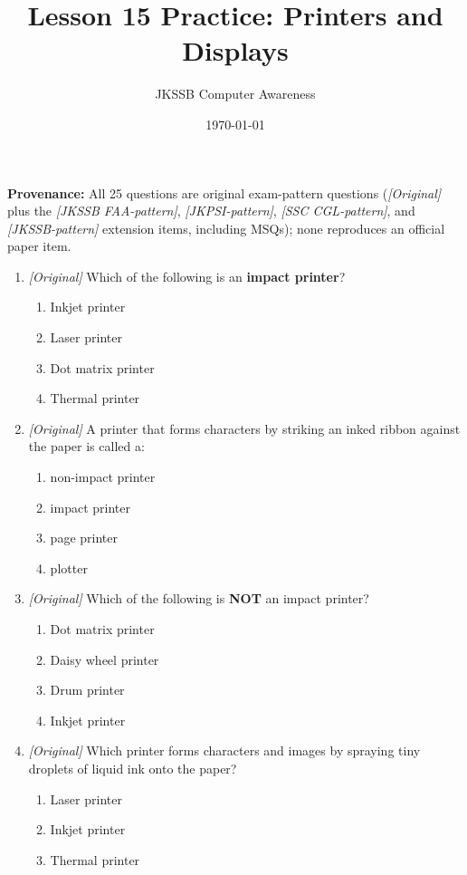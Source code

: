 \documentclass[11pt]{article}
\title{Lesson 15 Practice: Printers and Displays}
\author{JKSSB Computer Awareness}
\date{\today}
\begin{document}
\maketitle
\noindent\textbf{Provenance:} All 25 questions are original exam-pattern questions (\textit{[Original]} plus the \textit{[JKSSB FAA-pattern]}, \textit{[JKPSI-pattern]}, \textit{[SSC CGL-pattern]}, and \textit{[JKSSB-pattern]} extension items, including MSQs); none reproduces an official paper item.

\begin{enumerate}[label=\textbf{Q\arabic*.}, leftmargin=*]
\item \textit{[Original]} Which of the following is an \textbf{impact
  printer}?
  \begin{enumerate}[label=\Alph*.]
    \item Inkjet printer
    \item Laser printer
    \item Dot matrix printer
    \item Thermal printer
  \end{enumerate}
\item \textit{[Original]} A printer that forms characters by striking an
  inked ribbon against the paper is called a:
  \begin{enumerate}[label=\Alph*.]
    \item non-impact printer
    \item impact printer
    \item page printer
    \item plotter
  \end{enumerate}
\item \textit{[Original]} Which of the following is \textbf{NOT} an impact
  printer?
  \begin{enumerate}[label=\Alph*.]
    \item Dot matrix printer
    \item Daisy wheel printer
    \item Drum printer
    \item Inkjet printer
  \end{enumerate}
\item \textit{[Original]} Which printer forms characters and images by
  spraying tiny droplets of liquid ink onto the paper?
  \begin{enumerate}[label=\Alph*.]
    \item Laser printer
    \item Inkjet printer
    \item Thermal printer

\end{enumerate}
\end{enumerate}
\end{document}

